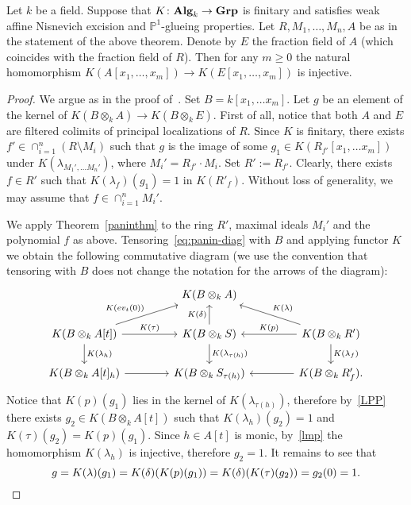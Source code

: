 \documentclass[oneside, 11pt]{amsart} \pdfoutput=1
\begin{document}
\begin{corollary}
\label{esssmooth}
Let $k$ be a field.
Suppose that $K\colon{\normalfont\textbf{Alg}}_k\rightarrow{\normalfont\textbf{Grp}}$ is finitary and satisfies weak affine Nisnevich excision and $\mathbb{P}^1$-glueing properties. Let $R, M_1, \ldots, M_n, A$ be as in the statement of the above theorem. Denote by $E$ the fraction field of $A$ {\rm(}which coincides with the fraction field of $R${\rm)}.
Then for any $m\geq 0$ the natural homomorphism $K(A[x_1,\ldots, x_m])\to K(E[x_1,\ldots,x_m])$ is injective.
\end{corollary}
\begin{proof}
We argue as in the proof of~\cite[Theorem~3.2]{Sta20}. Set $B=k[x_1,\ldots x_m]$. Let $g$ be an element of the kernel of $K(B \otimes_k A)\rightarrow K(B \otimes_k E)$. First of all, notice that both $A$ and $E$ are filtered colimits of principal localizations of $R$. Since $K$ is finitary, there exists $f' \in \cap_{i=1}^n(R \setminus M_i)$ such that $g$ is the image of some $g_1 \in K(R_{f'}[x_1,\ldots x_m])$ under $K(\lambda_{M_1',\ldots M_n'})$, where $M_i' = R_{f'} \cdot M_i$. Set $R' := R_{f'}$.
Clearly, there exists $f \in R'$ such that $K(\lambda_{f})(g_1) = 1$ in $K(R'_{f})$. 
Without loss of generality, we may assume that $f \in \cap_{i=1}^n M_i'$. 

We apply Theorem~\ref{paninthm} to the ring $R'$, maximal ideals $M_i'$ and the polynomial $f$ as above.
Tensoring~\eqref{eq:panin-diag} with $B$ and applying functor $K$ we obtain the following commutative diagram (we use the convention that tensoring with $B$ does not change the notation for the arrows of the diagram):
\begin{equation*} 
 \begin{tikzcd}[column sep=4em]
   & K(B \otimes_k A) & \\ 
   K(B \otimes_k A[t]) \ar{d}{K(\lambda_h)} \ar{ru}{K(ev_t(0))} \ar{r}{K(\tau)} & K(B \otimes_k S) \ar{u}{K(\delta)} \ar{d}{K(\lambda_{\tau(h)})}  & K(B \otimes_k R') \ar{ul}[swap]{K(\lambda)} \ar{d}{K(\lambda_f)} \ar{l}[swap]{K(p)} \\
   K(B \otimes_k A[t]_h) \ar{r}[swap]{}              & K(B \otimes_k S_{\tau(h)})      & K(B \otimes_k R'_f). \ar{l}{}\end{tikzcd}
\end{equation*}
Notice that $K(p)(g_1)$ lies in the kernel of $K(\lambda_{\tau(h)})$, therefore by~\ref{LPP} there exists $g_2\in K(B \otimes_k A[t])$ such that $K(\lambda_h)(g_2)=1$ and $K(\tau)(g_2)=K(p)(g_1)$. Since $h \in A[t]$ is monic, by~\cref{lmp} the homomorphism $K(\lambda_h)$ is injective, therefore $g_2=1$. It remains to see that
$$g=K(\lambda)(g_1)=K(\delta)(K(p)(g_1))=K(\delta)(K(\tau)(g_2))=g_2(0)=1.\qedhere$$
\end{proof}
\end{document}
